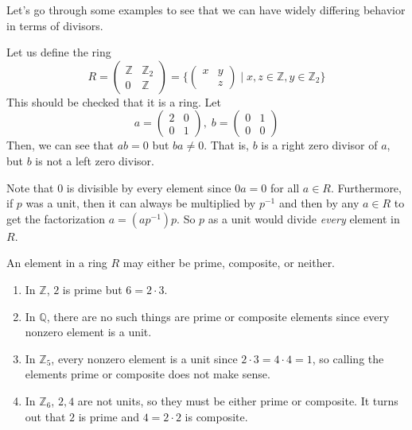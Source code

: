   Let's go through some examples to see that we can have widely differing behavior in terms of divisors. 

  \begin{example}
    Let us define the ring
    \begin{equation}
      R = \begin{pmatrix} \mathbb{Z} & \mathbb{Z}_2 \\ 0 & \mathbb{Z} \end{pmatrix} = \bigg\{ \begin{pmatrix} x & y \\ & z \end{pmatrix} \; \bigg| \; x, z \in \mathbb{Z}, y \in \mathbb{Z}_2 \bigg\} 
    \end{equation}
    This should be checked that it is a ring. Let 
    \begin{equation}
      a = \begin{pmatrix} 2 & 0 \\ 0 & 1 \end{pmatrix}, \; b = \begin{pmatrix} 0 & 1 \\ 0 & 0 \end{pmatrix}
    \end{equation}
    Then, we can see that $ab = 0$ but $ba \neq 0$. That is, $b$ is a right zero divisor of $a$, but $b$ is not a left zero divisor. 
  \end{example}

  Note that $0$ is divisible by every element since $0a = 0$ for all $a \in R$. Furthermore, if $p$ was a unit, then it can always be multiplied by $p^{-1}$ and then by any $a \in R$ to get the factorization $a = (a p^{-1}) p$. So $p$ as a unit would divide \textit{every} element in $R$. 

  \begin{example}
    An element in a ring $R$ may either be prime, composite, or neither. 
    \begin{enumerate}
      \item In $\mathbb{Z}$, $2$ is prime but $6 = 2 \cdot 3$. 
      \item In $\mathbb{Q}$, there are no such things are prime or composite elements since every nonzero element is a unit. 
      \item In $\mathbb{Z}_5$, every nonzero element is a unit since $2 \cdot 3 = 4 \cdot 4 = 1$, so calling the elements prime or composite does not make sense. 
      \item In $\mathbb{Z}_6$, $2, 4$ are not units, so they must be either prime or composite. It turns out that $2$ is prime and $4 = 2 \cdot 2$ is composite. 
    \end{enumerate}
  \end{example}

